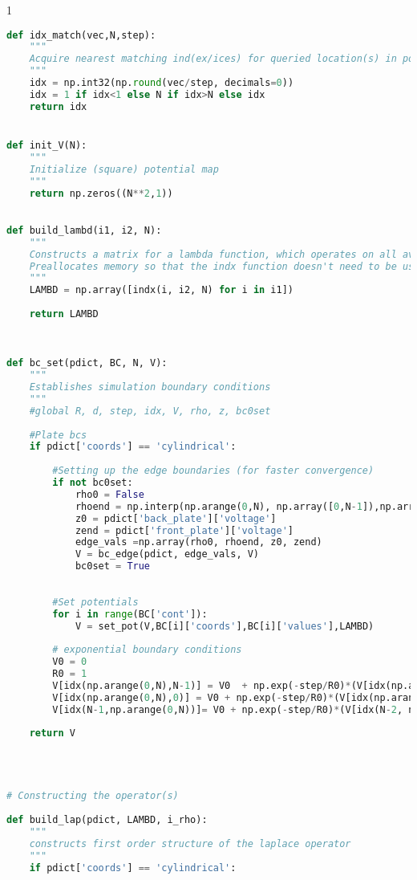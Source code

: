 \begin{spacing}{1}
\begin{lstlisting}[frame=single, language=Python]
def idx_match(vec,N,step):
    """
    Acquire nearest matching ind(ex/ices) for queried location(s) in potential map
    """
    idx = np.int32(np.round(vec/step, decimals=0))
    idx = 1 if idx<1 else N if idx>N else idx
    return idx


def init_V(N):
    """
    Initialize (square) potential map
    """
    return np.zeros((N**2,1))
    

def build_lambd(i1, i2, N):
    """
    Constructs a matrix for a lambda function, which operates on all available indices in the simulation.
    Preallocates memory so that the indx function doesn't need to be used twice (reducing computations).
    """
    LAMBD = np.array([indx(i, i2, N) for i in i1])
    
    return LAMBD
        
    

def bc_set(pdict, BC, N, V):
    """
    Establishes simulation boundary conditions
    """
    #global R, d, step, idx, V, rho, z, bc0set
    
    #Plate bcs
    if pdict['coords'] == 'cylindrical':
        
        #Setting up the edge boundaries (for faster convergence)  
        if not bc0set:
            rho0 = False
            rhoend = np.interp(np.arange(0,N), np.array([0,N-1]),np.array([pdict['back_plate']['voltage'],pdict['front_plate']['voltage']])).reshape(N,1)
            z0 = pdict['back_plate']['voltage']
            zend = pdict['front_plate']['voltage']
            edge_vals =np.array(rho0, rhoend, z0, zend)
            V = bc_edge(pdict, edge_vals, V)
            bc0set = True
            
            
        #Set potentials
        for i in range(BC['cont']):
            V = set_pot(V,BC[i]['coords'],BC[i]['values'],LAMBD)
        
        # exponential boundary conditions
        V0 = 0
        R0 = 1
        V[idx(np.arange(0,N),N-1)] = V0  + np.exp(-step/R0)*(V[idx(np.arange(0,N), N-2)]-V0)
        V[idx(np.arange(0,N),0)] = V0 + np.exp(-step/R0)*(V[idx(np.arange(0,N),1)]-V0)
        V[idx(N-1,np.arange(0,N))]= V0 + np.exp(-step/R0)*(V[idx(N-2, np.arange(0,N))]-V0) 
                 
    return V
                 

                 

# Constructing the operator(s)
    
def build_lap(pdict, LAMBD, i_rho):
    """
    constructs first order structure of the laplace operator
    """
    if pdict['coords'] == 'cylindrical':
        

\end{lstlisting}
\end{spacing}
